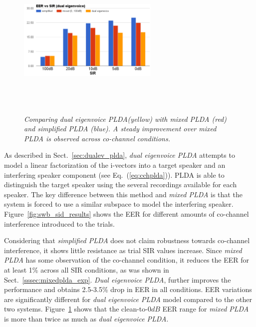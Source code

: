 \begin{figure}[b!]
	\centering
	\includegraphics[height = 3in, width=0.6\textwidth]{figures/eer_vs_sir_dualeigenvoice}
	\vspace{-2mm}
	\caption{\it \small Comparing {\it dual eigenvoice PLDA}(yellow) with {\it mixed PLDA} (red) and {\it simplified PLDA} (blue). A steady improvement over {\it mixed PLDA} is observed across co-channel conditions. }
	\label{fig:eer_dualeigenvoice}
	\vspace{-1mm}
\end{figure}

As described in Sect.~\ref{sec:dualev_plda}, {\it dual eigenvoice PLDA} attempts to model a linear factorization of the i-vectors into a target speaker and an interfering speaker component (see Eq.~(\ref{eq:cchplda})). 
PLDA is able to distinguish the target speaker using the several recordings available for each speaker. 
The key difference between this method and {\it mixed PLDA} is that the system is forced to use a similar subspace to model the interfering speaker. 
Figure~\ref{fig:swb_sid_results} shows the EER for different amounts of co-channel interference introduced to the trials. 

Considering that {\it simplified PLDA} does not claim robustness towards co-channel interference, it shows little resistance as trial SIR values increase. 
Since {\it mixed PLDA} has some observation of the co-channel condition, it reduces the EER for at least 1\% across all SIR conditions, as was shown in Sect.~\ref{sssec:mixedplda_exp}. {\it Dual eigenvoice PLDA}, further improves the performance and obtains 2.5-3.5\% drop in EER in all conditions. EER variations are significantly different for {\it dual eigenvoice PLDA} model compared to the other two systems. 
Figure~\ref{fig:eer_dualeigenvoice} shows that the clean-to-$0dB$ EER range for {\it mixed PLDA} is more than twice as much as {\it dual eigenvoice PLDA}. 



